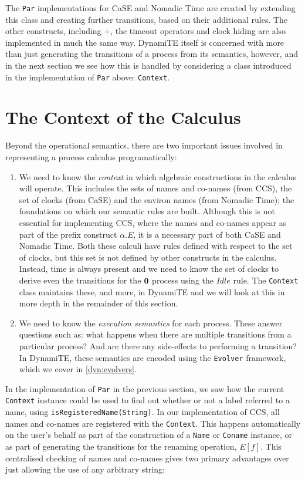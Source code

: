 The \texttt{Par} implementations for CaSE and Nomadic Time are created
by extending this class and creating further transitions, based on
their additional rules.  The other constructs, including $+$, the
timeout operators and clock hiding are also implemented in much the
same way.  DynamiTE itself is concerned with more than just generating
the transitions of a process from its semantics, however, and in the
next section we see how this is handled by considering a class
introduced in the implementation of \texttt{Par} above:
\texttt{Context}.

\section{The Context of the Calculus}
\label{dyn:context}

Beyond the operational semantics, there are two important issues
involved in representing a process calculus programatically:

\begin{enumerate}
\item We need to know the \emph{context} in which algebraic
  constructions in the calculus will operate.  This includes the sets
  of names and co-names (from CCS), the set of clocks (from CaSE) and
  the environ names (from Nomadic Time); the foundations on which our
  semantic rules are built.  Although this is not essential for
  implementing CCS, where the names and co-names appear as part of the
  prefix construct $\alpha.E$, it is a necessary part of both CaSE and
  Nomadic Time.  Both these calculi have rules defined with respect to
  the set of clocks, but this set is not defined by other constructs
  in the calculus.  Instead, time is always present and we need to
  know the set of clocks to derive even the transitions for the $\textbf{0}$
  process using the $Idle$ rule.  The \texttt{Context} class maintains
  these, and more, in DynamiTE and we will look at this in more depth
  in the remainder of this section.
\item We need to know the \emph{execution semantics} for each process.
  These answer questions such as: what happens when there are multiple
  transitions from a particular process? And are there any
  side-effects to performing a transition?  In DynamiTE, these
  semantics are encoded using the \texttt{Evolver} framework, which we
  cover in \ref{dyn:evolvers}.
\end{enumerate}

In the implementation of \texttt{Par} in the previous section, we saw
how the current \texttt{Context} instance could be used to find out
whether or not a label referred to a name, using
\texttt{isRegisteredName(String)}.  In our implementation of CCS, all
names and co-names are registered with the \texttt{Context}.  This
happens automatically on the user's behalf as part of the construction
of a \texttt{Name} or \texttt{Coname} instance, or as part of
generating the transitions for the renaming operation, $E[f]$.  This
centralised checking of names and co-names gives two primary
advantages over just allowing the use of any arbitrary string:

